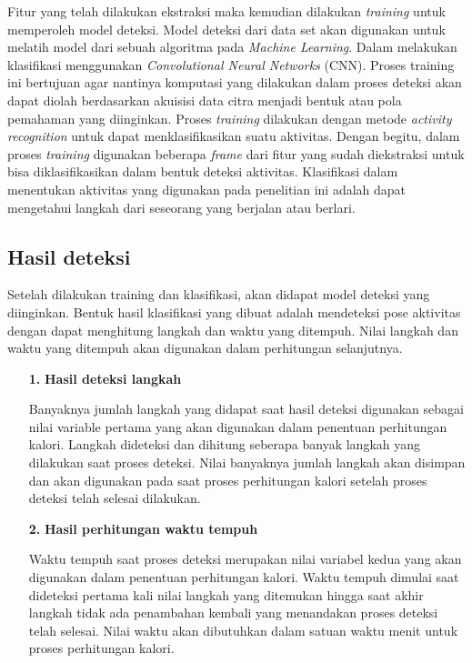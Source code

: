   Fitur yang telah dilakukan ekstraksi maka kemudian dilakukan \emph{training} untuk memperoleh model deteksi. Model deteksi dari data set akan digunakan untuk melatih model dari sebuah algoritma pada \emph{Machine Learning}. Dalam melakukan klasifikasi menggunakan \emph{Convolutional Neural Networks} (CNN). Proses training ini bertujuan agar nantinya komputasi yang dilakukan dalam proses deteksi akan dapat diolah berdasarkan akuisisi data citra menjadi bentuk atau pola pemahaman yang diinginkan. Proses \emph{training} dilakukan dengan metode \emph{activity recognition} untuk dapat menklasifikasikan suatu aktivitas. Dengan begitu, dalam proses \emph{training} digunakan beberapa \emph{frame} dari fitur yang sudah diekstraksi untuk bisa diklasifikasikan dalam bentuk deteksi aktivitas. Klasifikasi dalam menentukan aktivitas yang digunakan pada penelitian ini adalah dapat mengetahui langkah dari seseorang yang berjalan atau berlari.

  \subsection{Hasil deteksi}

  Setelah dilakukan training dan klasifikasi, akan didapat model deteksi yang diinginkan. Bentuk hasil klasifikasi yang dibuat adalah mendeteksi pose aktivitas dengan dapat menghitung langkah dan waktu yang ditempuh. Nilai langkah dan waktu yang ditempuh akan digunakan dalam perhitungan selanjutnya.

  \begin{enumerate}[listparindent=2em]
    \item[\textbf{1.}] \textbf{Hasil deteksi langkah}
    
    Banyaknya jumlah langkah yang didapat saat hasil deteksi digunakan sebagai nilai variable pertama yang akan digunakan dalam penentuan perhitungan kalori. Langkah dideteksi dan dihitung seberapa banyak langkah yang dilakukan saat proses deteksi. Nilai banyaknya jumlah langkah akan disimpan dan akan digunakan pada saat proses perhitungan kalori setelah proses deteksi telah selesai dilakukan.

    \item[\textbf{2.}] \textbf{Hasil perhitungan waktu tempuh}
    
    Waktu tempuh saat proses deteksi merupakan nilai variabel kedua yang akan digunakan dalam penentuan perhitungan kalori. Waktu tempuh dimulai saat dideteksi pertama kali nilai langkah yang ditemukan hingga saat akhir langkah tidak ada penambahan kembali yang menandakan proses deteksi telah selesai. Nilai waktu akan dibutuhkan dalam satuan waktu menit untuk proses perhitungan kalori.

  \end{enumerate}
  
